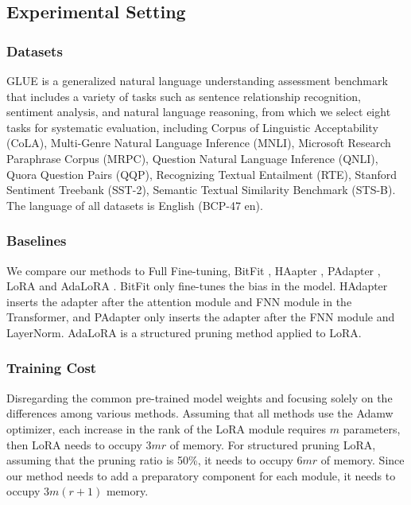 \subsection{Experimental Setting}
\subsubsection{Datasets}
GLUE \cite{e:1} is a generalized natural language understanding assessment benchmark that includes a variety of tasks such as sentence relationship recognition, sentiment analysis, and natural language reasoning, from which we select eight tasks for systematic evaluation, including Corpus of Linguistic Acceptability (CoLA), Multi-Genre Natural Language Inference (MNLI), Microsoft Research Paraphrase Corpus (MRPC), Question Natural Language Inference (QNLI), Quora Question Pairs (QQP), Recognizing Textual Entailment (RTE), Stanford Sentiment Treebank (SST-2), Semantic Textual Similarity Benchmark (STS-B). The language of all datasets is English (BCP-47 en).

\subsubsection{Baselines}
We compare our methods to Full Fine-tuning, BitFit \cite{peft:bitfit}, HAapter \cite{peft:adapter}, PAdapter \cite{peft:PAdapter}, LoRA \cite{peft:lora} and AdaLoRA \cite{peft:adalora}. BitFit only fine-tunes the bias in the model. HAdapter inserts the adapter after the attention module and FNN module in the Transformer, and PAdapter only inserts the adapter after the FNN module and LayerNorm. AdaLoRA is a structured pruning method applied to LoRA.

\subsubsection{Training Cost} Disregarding the common pre-trained model weights and focusing solely on the differences among various methods. Assuming that all methods use the Adamw optimizer, each increase in the rank of the LoRA module requires $m$ parameters, then LoRA needs to occupy $3mr$ of memory. For structured pruning LoRA, assuming that the pruning ratio is 50\%, it needs to occupy $6mr$ of memory. Since our method needs to add a preparatory component for each module, it needs to occupy $3m(r+1)$ memory.

